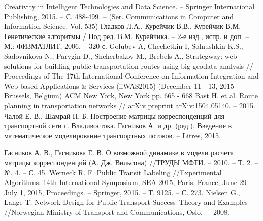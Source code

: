 \begin{thebibliography}{10}
        Creativity in Intelligent Technologies and Data Science. -- Springer International Publishing, 
        2015. -- С. 488-499. -- (Ser. Communications in Computer and Information Science. Vol. 535)
     Гладков Л.А., Курейчик В.В., Курейчик В.М. Генетические алгоритмы / 
        Под ред. В.М. Курейчика. -- 2-е изд., испр. и доп. -- М.: ФИЗМАТЛИТ, 2006. -- 320 с.
     Golubev A, Chechetkin I, Solnushkin K.S., Sadovnikova N., Parygin D., Shcherbakov M., 
        Brebels A., Strategway: web solutions for building public transportation routes using big geodata 
        analysis // Proceedings of The 17th International Conference on Information Integration and 
        Web-based Applications \& Services (iiWAS2015) (December 11 - 13, 2015 Brussels, Belgium) 
        ACM New York, New York pp. 665 - 668
     Bast H. et al. Route planning in transportation networks //
        arXiv preprint arXiv:1504.05140. -- 2015.
     Чалой Е. В., Шамрай Н. Б. Построение матрицы корреспонденций для транспортной 
        сети г. Владивостока.
     Гасников А. и др. (ред.). Введение в математическое моделирование транспортных 
        потоков. -- Litres, 2015.

     Гасников А. В., Гасникова Е. В. О возможной динамике в модели расчета матрицы 
        корреспонденций (А. Дж. Вильсона) //ТРУДЫ МФТИ. -- 2010. -- Т. 2. -- №. 4. -- С. 45.
     Werneck R. F. Public Transit Labeling //Experimental Algorithms: 
        14th International Symposium, SEA 2015, Paris, France, June 29–July 1, 2015, 
        Proceedings. -- Springer, 2015. -- Т. 9125. -- С. 273.
     Nielsen G., Lange T. Network Design for Public Transport Success–Theory 
        and Examples //Norwegian Ministry of Transport and Communications, Oslo. –- 2008.


\end{thebibliography}
